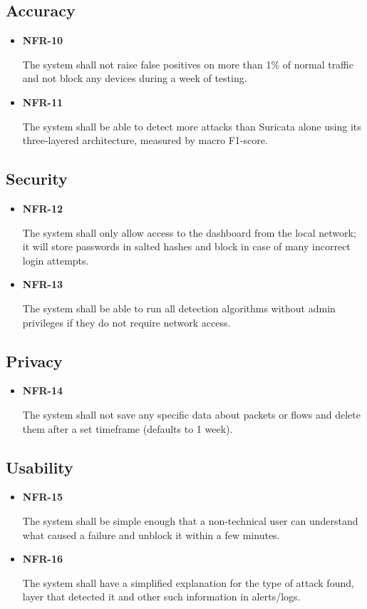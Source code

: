 \subsection{Accuracy}\label{sec:4.4.5}

\begin{itemize}
\item \hypertarget{req:NFR-10}{\textbf{NFR-10}} The system shall not raise false positives on more than 1\% of normal traffic and not block any devices during a week of testing.
\item \hypertarget{req:NFR-11}{\textbf{NFR-11}} The system shall be able to detect more attacks than Suricata alone using its three-layered architecture, measured by macro F1-score.
\end{itemize}

\subsection{Security}\label{sec:4.4.6}

\begin{itemize}
\item \hypertarget{req:NFR-12}{\textbf{NFR-12}} The system shall only allow access to the dashboard from the local network; it will store passwords in salted hashes and block in case of many incorrect login attempts.
\item \hypertarget{req:NFR-13}{\textbf{NFR-13}} The system shall be able to run all detection algorithms without admin privileges if they do not require network access.
\end{itemize}

\subsection{Privacy}\label{sec:4.4.7}

\begin{itemize}
\item \hypertarget{req:NFR-14}{\textbf{NFR-14}} The system shall not save any specific data about packets or flows and delete them after a set timeframe (defaults to 1 week).
\end{itemize}

\subsection{Usability}\label{sec:4.4.8}

\begin{itemize}
\item \hypertarget{req:NFR-15}{\textbf{NFR-15}} The system shall be simple enough that a non-technical user can understand what caused a failure and unblock it within a few minutes.
\item \hypertarget{req:NFR-16}{\textbf{NFR-16}} The system shall have a simplified explanation for the type of attack found, layer that detected it and other such information in alerts/logs.
\end{itemize}

